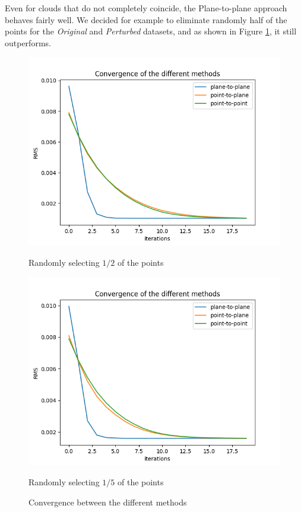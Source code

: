 \documentclass[11pt,letterpaper,leqno]{article}
\begin{document}
Even for clouds that do not completely coincide, the Plane-to-plane approach behaves fairly well. We decided for example to eliminate randomly half of the points for the \textit{Original} and \textit{Perturbed} datasets, and as shown in Figure \ref{fig:comp3}, it still outperforms.

\begin{figure}[ht!]
    \centering
    \begin{minipage}{0.5\linewidth}
    \includegraphics[width=\linewidth]{img/comparison_3.png}
    \caption{Randomly selecting $1/2$ of the points}
    \end{minipage}\hfill
    \begin{minipage}{0.5\linewidth}
    \includegraphics[width=\linewidth]{img/comparison_4.png}
    \caption{Randomly selecting $1/5$ of the points}
    \end{minipage}
    \caption{Convergence between the different methods}
    \label{fig:comp3}
\end{figure}
\end{document}
